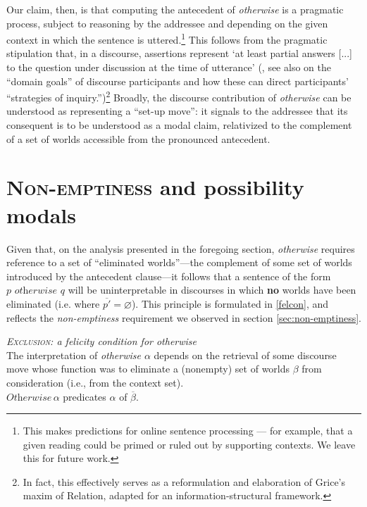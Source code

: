 \noindent Our claim, then, is that computing the antecedent of \textit{otherwise} is a pragmatic process, subject to reasoning by the addressee and depending on the given context in which the sentence is uttered.\footnote{This makes predictions for online sentence processing --- for example, that a given reading could be primed or ruled out by supporting contexts. We leave this for future work.} This follows from the pragmatic stipulation that, in a discourse, assertions represent `at least partial answers [...] to the question under discussion at the time of utterance' (\citealp[20--21]{Roberts2012}, see also \citealp{Roberts2004} on the ``domain goals'' of discourse participants and how these can direct participants' ``strategies of inquiry.'')\footnote{In fact, this effectively serves as a reformulation and elaboration of Grice's maxim of Relation, adapted for an information-structural framework.} Broadly, the discourse contribution of \textit{otherwise} can be understood as representing a ``set-up move'': it signals to the addressee that its consequent is to be understood as a modal claim, relativized to the complement of a set of worlds accessible from the pronounced antecedent. 



\section{\textsc{Non-emptiness} and possibility modals}
\label{sec:predictions}

Given that, on the analysis presented in the foregoing section, \textit{otherwise} requires reference to a set of ``eliminated worlds''---the complement of some set of worlds introduced by the antecedent clause---it follows that a sentence of the form $ p \textit{ otherwise } q$ will be uninterpretable in discourses in which \textbf{no} worlds have been eliminated (i.e. where $ \overline{p'}=\varnothing $). This principle is formulated in \ref{felcon}, and reflects the \textit{non-emptiness} requirement we observed in section \ref{sec:non-emptiness}.

\pex \label{felcon}\textit{\textsc{Exclusion}: a felicity condition for \emph{otherwise}}\\
The interpretation of \textit{otherwise $ \alpha $} depends on the retrieval of some discourse move whose function was to eliminate a (nonempty) set of worlds $ \beta $ from consideration (i.e., from the context set).\\$ \textit{Otherwise}\,\alpha $ predicates $ \alpha $ of $ \overline\beta $.\xe

